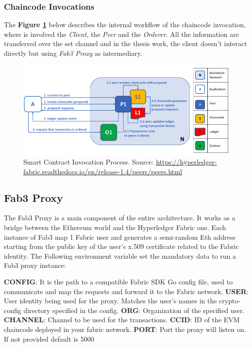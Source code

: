 \subsubsection{Chaincode Invocations}
The \textbf{Figure \ref{fig:sc_invokation}} below describes the internal workflow of the chaincode invocation, where is 
involved the \textit{Client}, the \textit{Peer} and the \textit{Orderer}. All the information are transferred over the 
set channel and in the thesis work, the client doesn't interact directly but using \textit{Fab3 Proxy}
as intermediary.

\begin{figure}[h!]
    \centering
    \includegraphics[totalheight=6cm]{img/sc_invokation.png}
    \caption{Smart Contract Invocation Process. Source: \url{https://hyperledger-fabric.readthedocs.io/en/release-1.4/peers/peers.html}}
    \label{fig:sc_invokation}
\end{figure}

\newpage
\subsection{Fab3 Proxy}

The Fab3 Proxy is a main component of the entire architecture. It works as a bridge between the Ethereum
world and the Hyperledger Fabric one. Each instance of Fab3 map 1 Fabric user and generates a semi-random 
Eth address starting from the public key of the user's x.509 certificate related to the Fabric identity. 
The Following environment variable set the mandatory data to run a Fab3 proxy instance:

\begin{outline}
    \1 \textbf{CONFIG}: It is the path to a compatible Fabric SDK Go config file, used to communicate and map the 
    requests and forward it to the Fabric network.
    \1 \textbf{USER}: User identity being used for the proxy. Matches the user's names in the crypto-config directory 
    specified in the config.
    \1 \textbf{ORG}: Organization of the specified user.
    \1 \textbf{CHANNEL}: Channel to be used for the transactions.
    \1 \textbf{CCID}: ID of the EVM chaincode deployed in your fabric network.
    \1 \textbf{PORT}: Port the proxy will listen on. If not provided default is 5000
\end{outline}

